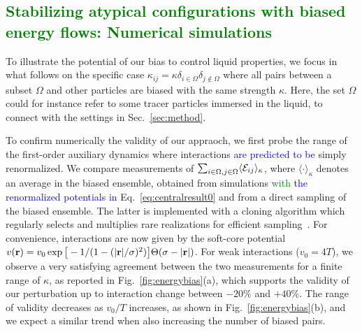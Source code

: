 \documentclass[superscriptaddress, twocolumn, prx, longbibliography, nofootinbib]{revtex4-1}
\begin{document}
\subsection{\textcolor{green}{Stabilizing atypical configurations with biased energy flows: Numerical simulations}}

To illustrate the potential of our bias to control liquid properties, we focus in what follows on the specific case $\kappa_{ij}=\kappa\delta_{i\in\Omega}\delta_{j\not\in\Omega}$ where all pairs between a subset $\Omega$ and other particles are biased with the same strength $\kappa$. Here, the set $\Omega$ could for instance refer to some tracer particles immersed in the liquid, to connect with the settings in Sec.~\ref{sec:method}. 


To confirm numerically the validity of our appraoch, we first probe the range of the first-order auxiliary dynamics where interactions \textcolor{blue}{are predicted to be} simply renormalized. We compare measurements of $\sum_{i\in\Omega, j\in\Omega}\langle{\cal E}_{ij}\rangle_\kappa$, where $\langle\cdot\rangle_\kappa$ denotes an average in the biased ensemble, obtained from simulations \textcolor{green}{with} \textcolor{blue}{the renormalized potentials in} Eq.~\ref{eq:centralresult0} and from a direct sampling of the biased ensemble. The latter is implemented with a cloning algorithm which regularly selects and multiplies rare realizations for efficient sampling~\cite{Giadina2006, tailleur2007probing, Hurtado2009, Nemoto2016, Ray2018, Klymko2018, Brewer2018}. For convenience, interactions are now given by the soft-core potential $v({\bf r}) = v_0\exp\big[-1 / (1 - (|{\bf r}|/\sigma)^2)\big]\Theta(\sigma-|{\bf r}|)$. For weak interactions ($v_0=4T$), we observe a very satisfying agreement between the two measurements for a finite range of $\kappa$, as reported in Fig.~\ref{fig:energybias}(a), which supports the validity of our perturbation up to interaction change between $-20\%$ and $+40\%$. The range of validity decreases as $v_0/T$ increases, as shown in Fig.~\ref{fig:energybias}(b), and we expect a similar trend when also increasing the number of biased pairs.
\end{document}
